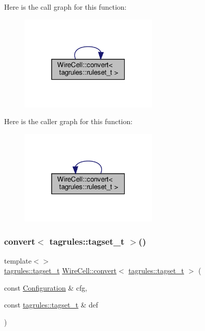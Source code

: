 Here is the call graph for this function\+:
\nopagebreak
\begin{figure}[H]
\begin{center}
\leavevmode
\includegraphics[width=187pt]{namespace_wire_cell_a3f34e0b2564286f437cd0a76970f6806_cgraph}
\end{center}
\end{figure}
Here is the caller graph for this function\+:
\nopagebreak
\begin{figure}[H]
\begin{center}
\leavevmode
\includegraphics[width=187pt]{namespace_wire_cell_a3f34e0b2564286f437cd0a76970f6806_icgraph}
\end{center}
\end{figure}
\mbox{\label{namespace_wire_cell_a02c87570501f0be739835ce24816d926}} 
\subsubsection{\texorpdfstring{convert$<$ tagrules\+::tagset\+\_\+t $>$()}{convert< tagrules::tagset\_t >()}}
{\footnotesize\ttfamily template$<$$>$ \\
\hyperlink{namespace_wire_cell_1_1tagrules_a80263165e3d13e49e317c045829f76cb}{tagrules\+::tagset\+\_\+t} \hyperlink{namespace_wire_cell_a5f6648d6ae801b20a17b8a35fd3306e5}{Wire\+Cell\+::convert}$<$ \hyperlink{namespace_wire_cell_1_1tagrules_a80263165e3d13e49e317c045829f76cb}{tagrules\+::tagset\+\_\+t} $>$ (\begin{DoxyParamCaption}\item[{const \hyperlink{namespace_wire_cell_a9f705541fc1d46c608b3d32c182333ee}{Configuration} \&}]{cfg,  }\item[{const \hyperlink{namespace_wire_cell_1_1tagrules_a80263165e3d13e49e317c045829f76cb}{tagrules\+::tagset\+\_\+t} \&}]{def }\end{DoxyParamCaption})\hspace{0.3cm}{\ttfamily [inline]}}



